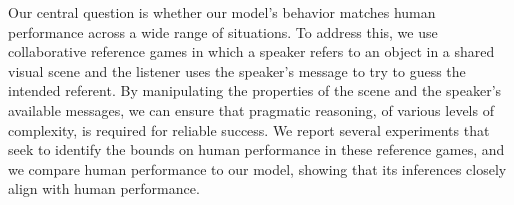 Our central question is whether our model's behavior matches human
performance across a wide range of situations. To address this, we use
collaborative reference games
\citep{Rosenberg:Cohen:1964,Clark:Wilkes-Gibbs:1986,DeVault-etal:2005}
in which a speaker refers to an object in a shared visual scene and
the listener uses the speaker's message to try to guess the intended
referent. By manipulating the properties of the scene and the
speaker's available messages, we can ensure that pragmatic reasoning,
of various levels of complexity, is required for reliable success. We
report several experiments that seek to identify the bounds on human
performance in these reference games, and we compare human performance
to our model, showing that its inferences closely align with human
performance.

